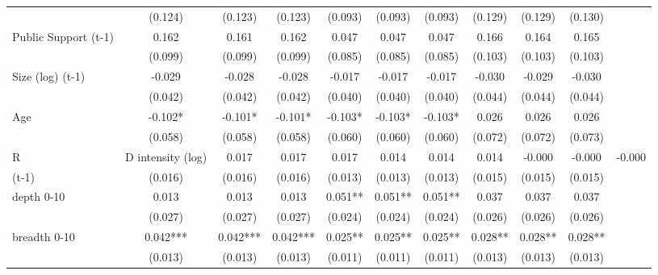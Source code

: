 \begin{table}[htbp]
\begin{tabular}{l*{9}{c}}
                    &     (0.124)   &     (0.123)   &     (0.123)   &     (0.093)   &     (0.093)   &     (0.093)   &     (0.129)   &     (0.129)   &     (0.130)   \\
Public Support (t-1)&       0.162   &       0.161   &       0.162   &       0.047   &       0.047   &       0.047   &       0.166   &       0.164   &       0.165   \\
                    &     (0.099)   &     (0.099)   &     (0.099)   &     (0.085)   &     (0.085)   &     (0.085)   &     (0.103)   &     (0.103)   &     (0.103)   \\
Size (log) (t-1)    &      -0.029   &      -0.028   &      -0.028   &      -0.017   &      -0.017   &      -0.017   &      -0.030   &      -0.029   &      -0.030   \\
                    &     (0.042)   &     (0.042)   &     (0.042)   &     (0.040)   &     (0.040)   &     (0.040)   &     (0.044)   &     (0.044)   &     (0.044)   \\
Age                 &      -0.102*  &      -0.101*  &      -0.101*  &      -0.103*  &      -0.103*  &      -0.103*  &       0.026   &       0.026   &       0.026   \\
                    &     (0.058)   &     (0.058)   &     (0.058)   &     (0.060)   &     (0.060)   &     (0.060)   &     (0.072)   &     (0.072)   &     (0.073)   \\
R&D intensity (log) &       0.017   &       0.017   &       0.017   &       0.014   &       0.014   &       0.014   &      -0.000   &      -0.000   &      -0.000   \\
(t-1)               &     (0.016)   &     (0.016)   &     (0.016)   &     (0.013)   &     (0.013)   &     (0.013)   &     (0.015)   &     (0.015)   &     (0.015)   \\
depth 0-10          &       0.013   &       0.013   &       0.013   &       0.051** &       0.051** &       0.051** &       0.037   &       0.037   &       0.037   \\
                    &     (0.027)   &     (0.027)   &     (0.027)   &     (0.024)   &     (0.024)   &     (0.024)   &     (0.026)   &     (0.026)   &     (0.026)   \\
breadth 0-10        &       0.042***&       0.042***&       0.042***&       0.025** &       0.025** &       0.025** &       0.028** &       0.028** &       0.028** \\
                    &     (0.013)   &     (0.013)   &     (0.013)   &     (0.011)   &     (0.011)   &     (0.011)   &     (0.013)   &     (0.013)   &     (0.013)   \\

\end{tabular}
\end{table}
